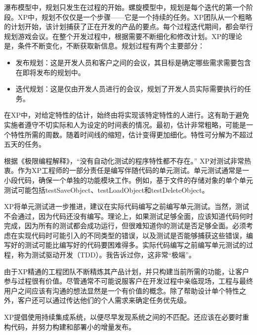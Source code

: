 
瀑布模型中，规划只发生在过程的开始。螺旋模型中，规划是每个迭代的第一个阶段。XP中，规划不仅仅是一个步骤——它是一个持续的任务。XP团队从一个粗略的计划开始，该计划捕获了正在开发的产品的要点。每个过程迭代期间，都会举行规划游戏会议。在整个开发过程中，根据需要不断细化和修改计划。XP的理论是，条件不断变化，不断获取新信息。规划过程有两个主要部分：

\begin{itemize}
\item
发布规划：这是开发人员和客户之间的会议，其目标是确定哪些需求需要包含在即将发布的规划中。

\item
迭代规划：这是仅由开发人员进行的会议，规划了开发人员实际需要执行的任务。
\end{itemize}

在XP中，对给定特性的估计，始终由将实现该特定特性的人进行。这有助于避免实施者遵守不切实际和人为设定的时间表的情况。最初，估计非常粗略，可能是一个特性所需的周数。随着时间线的缩短，估计变得更加细化。特性可分解为不超过五天的任务。


根据《极限编程解释》，“没有自动化测试的程序特性都不存在。” XP对测试非常热衷。作为XP工程师的一部分责任是编写伴随代码的单元测试。单元测试通常是一小段代码，确保一个单独的功能模块工作。例如，基于文件的存储对象的单个单元测试可能包括testSaveObject、testLoadObject和testDeleteObject。

XP将单元测试进一步推进，建议在实际代码编写之前编写单元测试。当然，测试不会通过，因为代码还没有编写。理论上，如果测试足够全面，应该知道代码何时完成，因为所有的测试都会成功运行，但很难知道你的测试是否足够全面。必须考虑在实现代码时可能引入的不同类型的错误，以及测试是否能够捕获这些错误，编写好的测试可能比编写好的代码要困难得多。实际代码编写之前编写单元测试的过程，称为测试驱动开发（TDD）。我告诉过你，这非常“极端”。


由于XP精通的工程团队不断精炼其产品计划，并只构建当前所需的功能，让客户参与过程很有价值。尽管通常不可能说服客户在开发过程中亲临现场，工程与最终用户之间应该有沟通的想法显然是一个有价值的概念。除了帮助设计单个特性之外，客户还可以通过传达他们的个人需求来确定任务优先级。


XP提倡使用持续集成系统，以便尽早发现系统之间的不匹配。还应该在必要时重构代码，并努力构建和部署小的增量发布。


